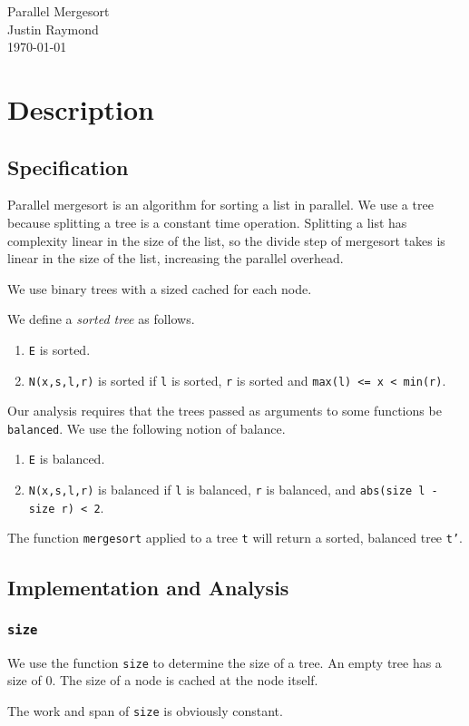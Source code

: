 \documentclass[12pt,letterpaper]{article}
\newcommand{\T}[1]{\texttt{#1}}
\begin{document}
\begin{flushright}
Parallel Mergesort\\
Justin Raymond\\
\today
\end{flushright}

\section{Description}
\subsection{Specification}
Parallel mergesort is an algorithm for sorting a list in parallel.
We use a tree because splitting a tree is a constant time operation.
Splitting a list has complexity linear in the size of the list, so
 the divide step of mergesort takes is linear in the size of the list,
 increasing the parallel overhead.

We use binary trees with a sized cached for each node.



We define a \textit{sorted tree} as follows.
\begin{enumerate}
  \item \T{E} is sorted.
  \item \T{N(x,s,l,r)} is sorted if \T{l} is sorted, \T{r} is sorted and \T{max(l) <= x < min(r)}.
\end{enumerate}

Our analysis requires that the trees passed as arguments to some functions be \T{balanced}.
We use the following notion of balance.
\begin{enumerate}
  \item \T{E} is balanced.
  \item \T{N(x,s,l,r)} is balanced if \T{l} is balanced, \T{r} is balanced, and \T{abs(size l - size r) < 2}.
\end{enumerate}

The function \T{mergesort} applied to a tree \T{t} will return a sorted, balanced tree \T{t'}.

\subsection{Implementation and Analysis}

\subsubsection{\T{size}} 
We use the function \T{size} to determine the size of a tree.
An empty tree has a size of 0.
The size of a node is cached at the node itself.

The work and span of \T{size} is obviously constant.
\end{document}
